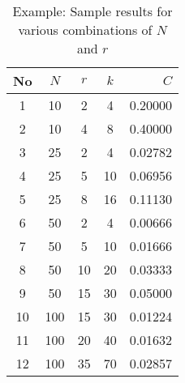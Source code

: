 \documentclass[11pt,a4,twocolumn]{article}
\theoremstyle{plain}
\theoremstyle{definition}
\theoremstyle{remark}
\begin{document}
\begin{table} [h]
\begin{tabular}{|c|c|cc|r|}
\hline
No & $N$ & $r$ & $k$ & $C$ \\
\hline
1 & 10 & 2 & 4& 0.20000 \\
2 & 10 & 4 & 8 &0.40000 \\
3 & 25 & 2 & 4 &0.02782 \\
4 & 25 & 5 & 10&0.06956 \\
5 & 25 & 8 & 16&0.11130 \\
6 & 50 & 2 & 4&0.00666 \\
7 & 50 & 5 & 10&0.01666 \\
8 & 50 & 10 & 20&0.03333 \\
9 & 50 & 15 & 30&0.05000 \\
10 & 100 & 15 &30&0.01224 \\
11 & 100 & 20 &40&0.01632 \\
12 & 100 & 35 &70&0.02857 \\
\hline
\end{tabular}
\caption{Example: Sample results for various combinations of $N$ and $r$}
\end{table}

\end{document}
